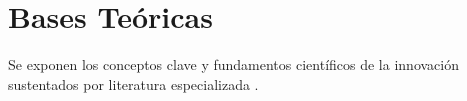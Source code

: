 \section{Bases Teóricas}
Se exponen los conceptos clave y fundamentos científicos de la innovación sustentados por literatura especializada \cite{knuth1984literate, lamport1994latex}.
